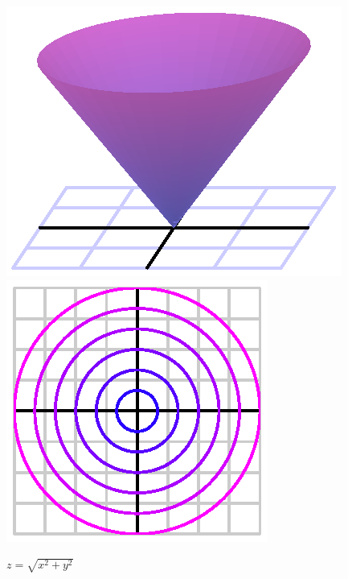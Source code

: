 \begin{figure}[ht]
  \begin{center}
    \includegraphics{figures/cone.eps}
    \hspace*{30pt}
    \includegraphics{figures/cone_contours.eps}
  \end{center}
  \caption{$z=\sqrt{x^2+y^2}$}
\end{figure}
\clearpage
